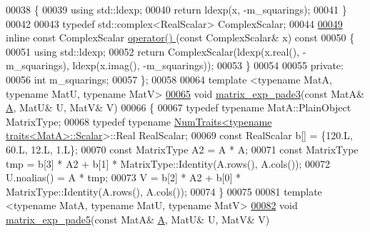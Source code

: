\begin{DoxyCode}
00038 \textcolor{keyword}{  }\{
00039     \textcolor{keyword}{using} std::ldexp;
00040     \textcolor{keywordflow}{return} ldexp(x, -m\_squarings);
00041   \}
00042 
00043   \textcolor{keyword}{typedef} std::complex<RealScalar> ComplexScalar;
00044 
\hyperlink{struct_eigen_1_1internal_1_1_matrix_exponential_scaling_op_a7c0d08f36bf3d6f8f6db34b3d3eb2b40}{00049}   \textcolor{keyword}{inline} \textcolor{keyword}{const} ComplexScalar \hyperlink{struct_eigen_1_1internal_1_1_matrix_exponential_scaling_op_ad4c95fe9fcbf59981c2a5a0a4e42041d}{operator() }(\textcolor{keyword}{const} ComplexScalar& x)\textcolor{keyword}{ const}
00050 \textcolor{keyword}{  }\{
00051     \textcolor{keyword}{using} std::ldexp;
00052     \textcolor{keywordflow}{return} ComplexScalar(ldexp(x.real(), -m\_squarings), ldexp(x.imag(), -m\_squarings));
00053   \}
00054 
00055   \textcolor{keyword}{private}:
00056     \textcolor{keywordtype}{int} m\_squarings;
00057 \};
00058 
00064 \textcolor{keyword}{template} <\textcolor{keyword}{typename} MatA, \textcolor{keyword}{typename} MatU, \textcolor{keyword}{typename} MatV>
\hyperlink{namespace_eigen_1_1internal_a7e6cf2e01b6fb376d33b9bb8183e5777}{00065} \textcolor{keywordtype}{void} \hyperlink{namespace_eigen_1_1internal_a7e6cf2e01b6fb376d33b9bb8183e5777}{matrix\_exp\_pade3}(\textcolor{keyword}{const} MatA& \hyperlink{group___core___module_class_eigen_1_1_matrix}{A}, MatU& U, MatV& V)
00066 \{
00067   \textcolor{keyword}{typedef} \textcolor{keyword}{typename} MatA::PlainObject MatrixType;
00068   \textcolor{keyword}{typedef} \textcolor{keyword}{typename} \hyperlink{group___core___module_struct_eigen_1_1_num_traits}{NumTraits<typename traits<MatA>::Scalar}>::Real 
      RealScalar;
00069   \textcolor{keyword}{const} RealScalar b[] = \{120.L, 60.L, 12.L, 1.L\};
00070   \textcolor{keyword}{const} MatrixType A2 = A * A;
00071   \textcolor{keyword}{const} MatrixType tmp = b[3] * A2 + b[1] * MatrixType::Identity(A.rows(), A.cols());
00072   U.noalias() = A * tmp;
00073   V = b[2] * A2 + b[0] * MatrixType::Identity(A.rows(), A.cols());
00074 \}
00075 
00081 \textcolor{keyword}{template} <\textcolor{keyword}{typename} MatA, \textcolor{keyword}{typename} MatU, \textcolor{keyword}{typename} MatV>
\hyperlink{namespace_eigen_1_1internal_af4992d182490219270a24aaa8285e63a}{00082} \textcolor{keywordtype}{void} \hyperlink{namespace_eigen_1_1internal_af4992d182490219270a24aaa8285e63a}{matrix\_exp\_pade5}(\textcolor{keyword}{const} MatA& \hyperlink{group___core___module_class_eigen_1_1_matrix}{A}, MatU& U, MatV& V)

\end{DoxyCode}
